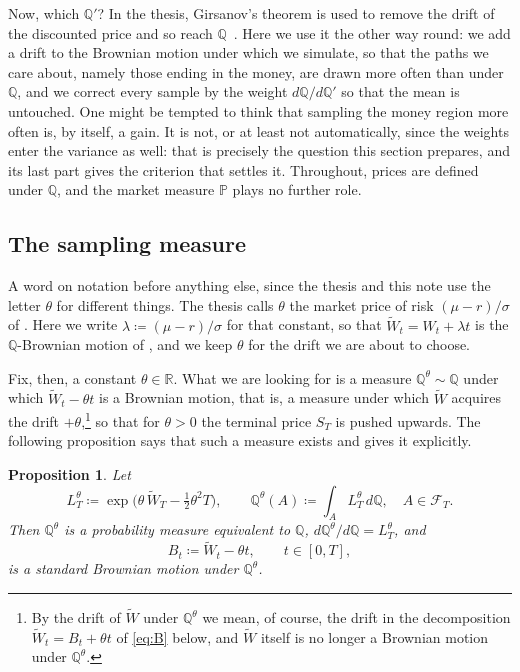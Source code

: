 \documentclass[11pt,a4paper]{article}
\theoremstyle{plain}
\newtheorem{proposition}[theorem]{Proposition}
\theoremstyle{definition}
\theoremstyle{remark}
\newcommand{\R}{\mathbb{R}}
\newcommand{\PP}{\mathbb{P}}
\newcommand{\Q}{\mathbb{Q}}
\newcommand{\F}{\mathcal{F}}
\newcommand{\1}{\mathbf{1}}
\newcommand{\eqdef}{\coloneqq}
\newcommand{\Wt}{\widetilde{W}}
\newcommand{\Qt}{\Q^{\theta}}
\begin{document}
Now, which $\Q'$? In the thesis, Girsanov's theorem is used to remove the drift of the discounted price and so reach $\Q$~\cite[\S 5.2.2]{tfg}. Here we use it the other way round: we add a drift to the Brownian motion under which we simulate, so that the paths we care about, namely those ending in the money, are drawn more often than under $\Q$, and we correct every sample by the weight $d\Q/d\Q'$ so that the mean is untouched. One might be tempted to think that sampling the money region more often is, by itself, a gain. It is not, or at least not automatically, since the weights enter the variance as well: that is precisely the question this section prepares, and its last part gives the criterion that settles it. Throughout, prices are defined under $\Q$, and the market measure $\PP$ plays no further role.

\subsection{The sampling measure}

A word on notation before anything else, since the thesis and this note use the letter $\theta$ for different things. The thesis calls $\theta$ the market price of risk $(\mu - r)/\sigma$ of \cite[(5.11)]{tfg}. Here we write $\lambda \eqdef (\mu - r)/\sigma$ for that constant, so that $\Wt_t = W_t + \lambda t$ is the $\Q$-Brownian motion of \cite[(5.13)]{tfg}, and we keep $\theta$ for the drift we are about to choose.

Fix, then, a constant $\theta \in \R$. What we are looking for is a measure $\Qt \sim \Q$ under which $\Wt_t - \theta t$ is a Brownian motion, that is, a measure under which $\Wt$ acquires the drift $+\theta$,\footnote{By the drift of $\Wt$ under $\Qt$ we mean, of course, the drift in the decomposition $\Wt_t = B_t + \theta t$ of \eqref{eq:B} below, and $\Wt$ itself is no longer a Brownian motion under $\Qt$.} so that for $\theta > 0$ the terminal price $S_T$ is pushed upwards. The following proposition says that such a measure exists and gives it explicitly.

\begin{proposition}\label{prop:Qtheta}
Let
\begin{equation}\label{eq:Ltheta}
  L^\theta_T \eqdef \exp\bigl(\theta\, \Wt_T - \tfrac12 \theta^2 T\bigr),
  \qquad
  \Qt(A) \eqdef \int_A L^\theta_T \, d\Q, \quad A \in \F_T .
\end{equation}
Then $\Qt$ is a probability measure equivalent to $\Q$, $d\Qt/d\Q = L^\theta_T$, and
\begin{equation}\label{eq:B}
  B_t \eqdef \Wt_t - \theta t, \qquad t \in [0,T],
\end{equation}
is a standard Brownian motion under $\Qt$.
\end{proposition}
\end{document}

